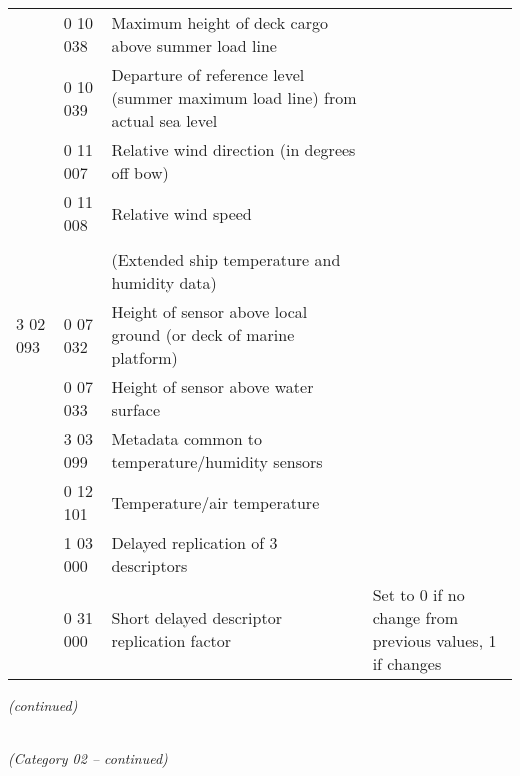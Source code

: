 \begin{longtable}[]{@{}llll@{}}
& 0 10 038 & Maximum height of deck cargo above summer load line &\tabularnewline
& 0 10 039 & Departure of reference level (summer maximum load line) from actual sea level &\tabularnewline
& 0 11 007 & Relative wind direction (in degrees off bow) &\tabularnewline
& 0 11 008 & Relative wind speed &\tabularnewline
& & &\tabularnewline
& & (Extended ship temperature and humidity data) &\tabularnewline
3 02 093 & 0 07 032 & Height of sensor above local ground (or deck of marine platform) &\tabularnewline
& 0 07 033 & Height of sensor above water surface &\tabularnewline
& 3 03 099 & Metadata common to temperature/humidity sensors &\tabularnewline
& 0 12 101 & Temperature/air temperature &\tabularnewline
& 1 03 000 & Delayed replication of 3 descriptors &\tabularnewline
& 0 31 000 & Short delayed descriptor replication factor & Set to 0 if no change from previous values, 1 if changes\tabularnewline
\bottomrule
\end{longtable}

\emph{(continued)}

\emph{\\
(Category 02 -- continued)}

